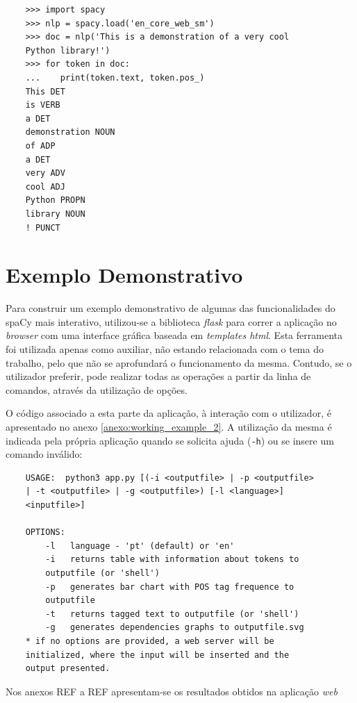 \documentclass[12pt]{article}
\begin{document}
\begin{verbatim}
	>>> import spacy
	>>> nlp = spacy.load('en_core_web_sm')
	>>> doc = nlp('This is a demonstration of a very cool
	Python library!')
	>>> for token in doc:
	...    print(token.text, token.pos_)
	This DET
	is VERB
	a DET
	demonstration NOUN
	of ADP
	a DET
	very ADV
	cool ADJ
	Python PROPN
	library NOUN
	! PUNCT	
\end{verbatim}


\section{Exemplo Demonstrativo} %

Para construir um exemplo demonstrativo de algumas das funcionalidades do spaCy mais interativo, utilizou-se a biblioteca \textit{flask} para correr a aplicação no \textit{browser} com uma interface gráfica baseada em \textit{templates html}. Esta ferramenta foi utilizada apenas como auxiliar, não estando relacionada com o tema do trabalho, pelo que não se aprofundará o funcionamento da mesma. Contudo, se o utilizador preferir, pode realizar todas as operações a partir da linha de comandos, através da utilização de opções.

O código associado a esta parte da aplicação, à interação com o utilizador, é apresentado no anexo \ref{anexo:working_example_2}. A utilização da mesma é indicada pela própria aplicação quando se solicita ajuda (\texttt{-h}) ou se insere um comando inválido:


\begin{verbatim}
    USAGE:  python3 app.py [(-i <outputfile> | -p <outputfile>
    | -t <outputfile> | -g <outputfile>) [-l <language>] 
    <inputfile>]

    OPTIONS:
        -l   language - 'pt' (default) or 'en'
		-i   returns table with information about tokens to
		outputfile (or 'shell')
		-p   generates bar chart with POS tag frequence to
		outputfile
        -t   returns tagged text to outputfile (or 'shell')
        -g   generates dependencies graphs to outputfile.svg
	* if no options are provided, a web server will be 
	initialized, where the input will be inserted and the
	output presented.
\end{verbatim}

Nos anexos {{REF}} a {{REF}} apresentam-se os resultados obtidos na aplicação \textit{web}
\end{document}
